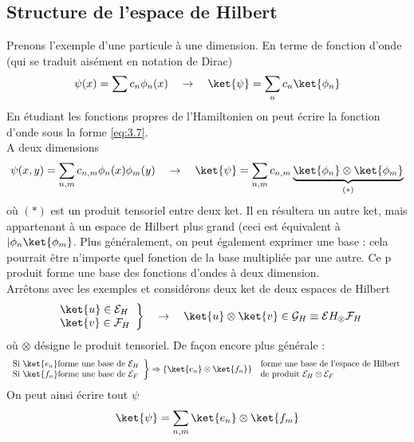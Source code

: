  \subsection{Structure de l'espace de Hilbert}
 Prenons l'exemple d'une particule à une dimension. En terme de fonction d'onde
 (qui se traduit aisément en notation de Dirac)
 \begin{equation}
 \psi(x) = \sum c_n\phi_n(x)\quad \rightarrow\quad \ket{\psi} = \sum_n c_n
 \ket{\phi_n}
 \label{eq:3.7}
 \end{equation}
 En étudiant les fonctions propres de l'Hamiltonien on peut écrire la fonction 
 d'onde sous la forme \autoref{eq:3.7}.\\
 A deux dimensions
 \begin{equation}
 \psi(x,y) = \sum_{n,m} c_{n,m}\phi_n(x)\phi_m(y)\quad\rightarrow\quad
 \ket{\psi} = \sum_{n,m} c_{n,m} \underbrace{\ket{\phi_n}\otimes\ket{\phi_m}}_{(*)}
 \end{equation}
 où $(*)$ est un produit tensoriel entre deux ket. Il en résultera un autre ket, 
 mais appartenant à un espace de Hilbert plus grand (ceci est équivalent à 
 $|\phi_n\ket{\phi_m}$. Plus généralement, on peut également exprimer une base :
  cela pourrait être n'importe quel fonction de la base multipliée par une autre. Ce p
 produit forme une base des fonctions d'ondes à deux dimension. \\
 
 Arrêtons avec les exemples et considérons deux ket de deux espaces de Hilbert
 \begin{equation}
 \left.\begin{array}{ll}
 \ket{u} \in \mathcal{E}_H\\
 \ket{v} \in \mathcal{F}_H 
 \end{array}\right\}\quad\rightarrow\quad \ket{u}\otimes\ket{v} \in\mathcal{G}_H 
 \equiv \mathcal{E}H_\otimes\mathcal{F}_H
 \end{equation}
 où $\otimes$ désigne le produit tensoriel. De façon encore plus générale :
 \begin{equation}
 \left.\begin{array}{l}
 \text{Si } \ket{e_n} \text{forme une base de } \mathcal{E}_H\\
 \text{Si } \ket{f_n} \text{forme une base de } \mathcal{E}_F 
 \end{array}\right\}\Rightarrow \left\{\ket{e_n}\otimes\ket{f_n}\right\} \begin{array}{l}
 \text{ forme  une base de l'espace de Hilbert }\\
 \text{  de produit $\mathcal{E}_H\otimes\mathcal{E}_F$}
 \end{array}
 \end{equation}
 On peut ainsi écrire tout $\psi$
 \begin{equation}
 \ket{\psi} = \sum_{n,m} \ket{e_n}\otimes\ket{f_m}
 \end{equation}
 
